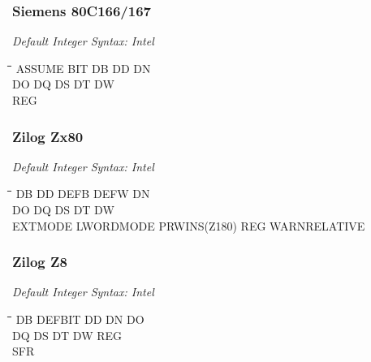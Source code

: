 \subsubsection{Siemens 80C166/167}

{\em Default Integer Syntax: Intel}

{\tt\begin{tabbing}
\hspace{3cm}\=\hspace{3cm}\=\hspace{3cm}\=\hspace{3cm}\=\kill
ASSUME     \> BIT         \> DB          \> DD          \> DN \\
DO         \> DQ          \> DS          \> DT          \> DW \\
REG \\
\end{tabbing}}

\subsubsection{Zilog Zx80}

{\em Default Integer Syntax: Intel}

{\tt\begin{tabbing}
\hspace{3cm}\=\hspace{3cm}\=\hspace{3cm}\=\hspace{3cm}\=\kill
DB         \> DD          \> DEFB        \> DEFW        \> DN \\
DO         \> DQ          \> DS          \> DT          \> DW \\
EXTMODE    \> LWORDMODE   \> PRWINS(Z180)\> REG         \> WARNRELATIVE \\
\end{tabbing}}

\subsubsection{Zilog Z8}

{\em Default Integer Syntax: Intel}

{\tt\begin{tabbing}
\hspace{3cm}\=\hspace{3cm}\=\hspace{3cm}\=\hspace{3cm}\=\kill
DB         \> DEFBIT      \> DD          \> DN          \> DO \\
DQ         \> DS          \> DT          \> DW          \> REG \\
SFR \\
\end{tabbing}}

